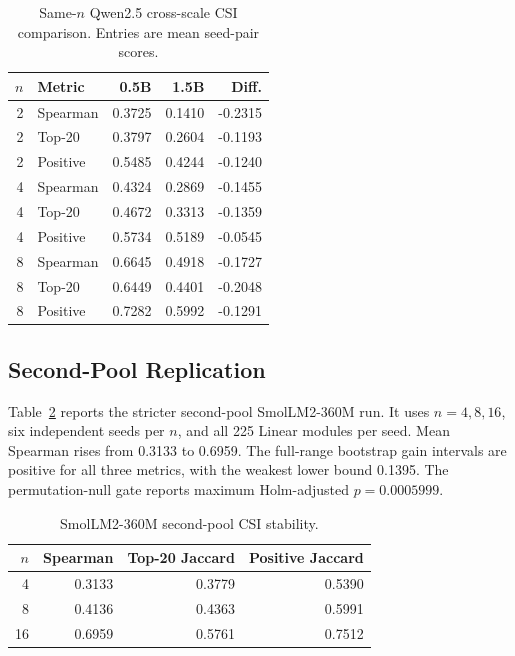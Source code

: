 \documentclass[letterpaper]{article}
\begin{document}
\begin{table}[t]
\centering
\small
\caption{Same-$n$ Qwen2.5 cross-scale CSI comparison. Entries are mean seed-pair
scores.}
\label{tab:crossscale}
\begin{tabular}{rlrrr}
\toprule
$n$ & Metric & 0.5B & 1.5B & Diff. \\
\midrule
2 & Spearman & 0.3725 & 0.1410 & -0.2315 \\
2 & Top-20 & 0.3797 & 0.2604 & -0.1193 \\
2 & Positive & 0.5485 & 0.4244 & -0.1240 \\
4 & Spearman & 0.4324 & 0.2869 & -0.1455 \\
4 & Top-20 & 0.4672 & 0.3313 & -0.1359 \\
4 & Positive & 0.5734 & 0.5189 & -0.0545 \\
8 & Spearman & 0.6645 & 0.4918 & -0.1727 \\
8 & Top-20 & 0.6449 & 0.4401 & -0.2048 \\
8 & Positive & 0.7282 & 0.5992 & -0.1291 \\
\bottomrule
\end{tabular}
\end{table}

\subsection{Second-Pool Replication}

Table~\ref{tab:smollm2} reports the stricter second-pool SmolLM2-360M run. It
uses $n=4,8,16$, six independent seeds per $n$, and all 225 Linear modules per
seed. Mean Spearman rises from 0.3133 to 0.6959. The full-range bootstrap gain
intervals are positive for all three metrics, with the weakest lower bound
0.1395. The permutation-null gate reports maximum Holm-adjusted
$p=0.0005999$.

\begin{table}[t]
\centering
\small
\caption{SmolLM2-360M second-pool CSI stability.}
\label{tab:smollm2}
\begin{tabular}{rrrr}
\toprule
$n$ & Spearman & Top-20 Jaccard & Positive Jaccard \\
\midrule
4 & 0.3133 & 0.3779 & 0.5390 \\
8 & 0.4136 & 0.4363 & 0.5991 \\
16 & 0.6959 & 0.5761 & 0.7512 \\
\bottomrule
\end{tabular}
\end{table}
\end{document}

